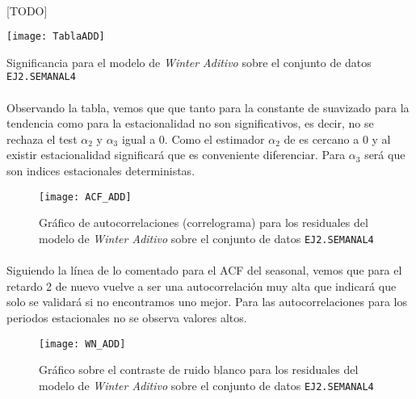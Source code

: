\documentclass[a4paper, spanish]{article}
\begin{document}
      \paragraph{}
      [TODO]

      \begin{table}[htb!]
        \centering
        \texttt{[image: TablaADD]}
        \caption{Significancia para el modelo de \emph{Winter Aditivo} sobre el conjunto de datos \texttt{EJ2.SEMANAL4}}
        \label{table:b_winter_additive_significance}
      \end{table}

      \paragraph{}
      Observando la tabla, vemos que que tanto para la constante de suavizado para la tendencia como para la estacionalidad no son significativos, es decir, no se rechaza el test $\alpha_2$ y $\alpha_3$ igual a 0. Como el estimador $\alpha_2$ de es cercano a 0 y al existir estacionalidad significará que es conveniente diferenciar. Para $\alpha_3$ será que son indices estacionales deterministas.

      \begin{figure}[htb!]
        \centering
        \texttt{[image: ACF\_ADD]}
        \caption{Gráfico de autocorrelaciones (correlograma) para los residuales del modelo de \emph{Winter Aditivo} sobre el conjunto de datos \texttt{EJ2.SEMANAL4}}
        \label{img:b_winter_additive_residuals_correlogram}
      \end{figure}

      \paragraph{}
      Siguiendo la línea de lo comentado para el ACF del seasonal, vemos que para el retardo 2 de nuevo vuelve a ser una autocorrelación muy alta que indicará que solo se validará si no encontramos uno mejor. Para las autocorrelaciones para los periodos estacionales no se observa valores altos.

      \begin{figure}[htb!]
        \centering
        \texttt{[image: WN\_ADD]}
        \caption{Gráfico sobre el contraste de ruido blanco para los residuales del modelo de \emph{Winter Aditivo} sobre el conjunto de datos \texttt{EJ2.SEMANAL4}}
        \label{img:b_winter_additive_test_white_noise}
      \end{figure}
\end{document}
